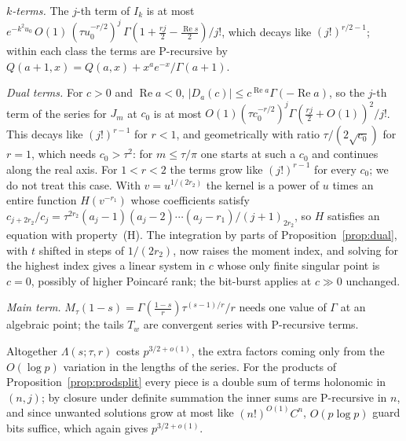 \begin{small}
\emph{$k$-terms.} The $j$-th term of $I_k$ is at most
$e^{-k^2u_0}\,O(1)\,(\tau u_0^{-r/2})^j\,\Gamma(1+\frac{rj}2-\frac{\operatorname{Re}s}2)/j!$, which decays like
$(j!)^{r/2-1}$; within each class the terms are P-recursive by $Q(a+1,x) = Q(a,x) + x^ae^{-x}/\Gamma(a+1)$.

\emph{Dual terms.} For $c > 0$ and $\operatorname{Re}a < 0$, $|D_a(c)| \le c^{\operatorname{Re}a}\Gamma(-\operatorname{Re}a)$,
so the $j$-th term of the series for $J_m$ at $c_0$ is at most $O(1)(\tau c_0^{-r/2})^j\Gamma(\frac{rj}2+O(1))^2/j!$.
This decays like $(j!)^{r-1}$ for $r < 1$, and geometrically with ratio $\tau/(2\sqrt{c_0})$ for $r = 1$, which needs
$c_0 > \tau^2$: for $m \le \tau/\pi$ one starts at such a $c_0$ and continues along the real axis. For $1 < r < 2$ the
terms grow like $(j!)^{r-1}$ for every $c_0$; we do not treat this case. With $v = u^{1/(2r_2)}$ the kernel is a power
of $u$ times an entire function $H(v^{-r_1})$ whose coefficients satisfy
$c_{j+2r_2}/c_j = \tau^{2r_2}(a_j-1)(a_j-2)\cdots(a_j-r_1)/(j+1)_{2r_2}$, so $H$ satisfies an equation with
property~(H). The integration by parts of Proposition~\ref{prop:dual}, with $t$ shifted in steps of $1/(2r_2)$, now
raises the moment index, and solving for the highest index gives a linear system in $c$ whose only finite singular
point is $c = 0$, possibly of higher Poincar\'e rank; the bit-burst applies at $c \gg 0$ unchanged.

\emph{Main term.} $M_\tau(1-s) = \Gamma(\frac{1-s}r)\tau^{(s-1)/r}/r$ needs one value of $\Gamma$ at an algebraic point;
the tails $T_w$ are convergent series with P-recursive terms.

Altogether $\Lambda(s;\tau,r)$ costs $p^{3/2+o(1)}$, the extra factors coming only from the $O(\log p)$ variation in the
lengths of the series. For the products of Proposition~\ref{prop:prodsplit} every piece is a double sum of terms
holonomic in $(n, j)$; by closure under definite summation \cite{Zei90} the inner sums are P-recursive in $n$, and
since unwanted solutions grow at most like $(n!)^{O(1)}C^n$, $O(p\log p)$ guard bits suffice, which again gives
$p^{3/2+o(1)}$.

\end{small}
